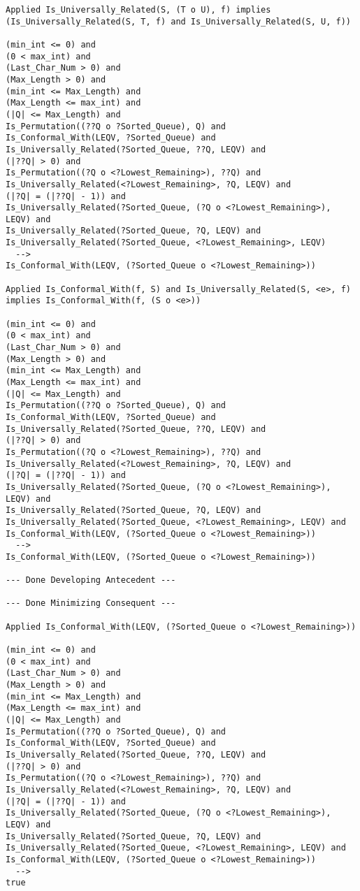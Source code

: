 \begin{lstlisting}[language=resolve]
Applied Is_Universally_Related(S, (T o U), f) implies (Is_Universally_Related(S, T, f) and Is_Universally_Related(S, U, f))

(min_int <= 0) and
(0 < max_int) and
(Last_Char_Num > 0) and
(Max_Length > 0) and
(min_int <= Max_Length) and
(Max_Length <= max_int) and
(|Q| <= Max_Length) and
Is_Permutation((??Q o ?Sorted_Queue), Q) and
Is_Conformal_With(LEQV, ?Sorted_Queue) and
Is_Universally_Related(?Sorted_Queue, ??Q, LEQV) and
(|??Q| > 0) and
Is_Permutation((?Q o <?Lowest_Remaining>), ??Q) and
Is_Universally_Related(<?Lowest_Remaining>, ?Q, LEQV) and
(|?Q| = (|??Q| - 1)) and
Is_Universally_Related(?Sorted_Queue, (?Q o <?Lowest_Remaining>), LEQV) and
Is_Universally_Related(?Sorted_Queue, ?Q, LEQV) and
Is_Universally_Related(?Sorted_Queue, <?Lowest_Remaining>, LEQV)
  -->
Is_Conformal_With(LEQV, (?Sorted_Queue o <?Lowest_Remaining>))

Applied Is_Conformal_With(f, S) and Is_Universally_Related(S, <e>, f) implies Is_Conformal_With(f, (S o <e>))

(min_int <= 0) and
(0 < max_int) and
(Last_Char_Num > 0) and
(Max_Length > 0) and
(min_int <= Max_Length) and
(Max_Length <= max_int) and
(|Q| <= Max_Length) and
Is_Permutation((??Q o ?Sorted_Queue), Q) and
Is_Conformal_With(LEQV, ?Sorted_Queue) and
Is_Universally_Related(?Sorted_Queue, ??Q, LEQV) and
(|??Q| > 0) and
Is_Permutation((?Q o <?Lowest_Remaining>), ??Q) and
Is_Universally_Related(<?Lowest_Remaining>, ?Q, LEQV) and
(|?Q| = (|??Q| - 1)) and
Is_Universally_Related(?Sorted_Queue, (?Q o <?Lowest_Remaining>), LEQV) and
Is_Universally_Related(?Sorted_Queue, ?Q, LEQV) and
Is_Universally_Related(?Sorted_Queue, <?Lowest_Remaining>, LEQV) and
Is_Conformal_With(LEQV, (?Sorted_Queue o <?Lowest_Remaining>))
  -->
Is_Conformal_With(LEQV, (?Sorted_Queue o <?Lowest_Remaining>))

--- Done Developing Antecedent ---

--- Done Minimizing Consequent ---

Applied Is_Conformal_With(LEQV, (?Sorted_Queue o <?Lowest_Remaining>))

(min_int <= 0) and
(0 < max_int) and
(Last_Char_Num > 0) and
(Max_Length > 0) and
(min_int <= Max_Length) and
(Max_Length <= max_int) and
(|Q| <= Max_Length) and
Is_Permutation((??Q o ?Sorted_Queue), Q) and
Is_Conformal_With(LEQV, ?Sorted_Queue) and
Is_Universally_Related(?Sorted_Queue, ??Q, LEQV) and
(|??Q| > 0) and
Is_Permutation((?Q o <?Lowest_Remaining>), ??Q) and
Is_Universally_Related(<?Lowest_Remaining>, ?Q, LEQV) and
(|?Q| = (|??Q| - 1)) and
Is_Universally_Related(?Sorted_Queue, (?Q o <?Lowest_Remaining>), LEQV) and
Is_Universally_Related(?Sorted_Queue, ?Q, LEQV) and
Is_Universally_Related(?Sorted_Queue, <?Lowest_Remaining>, LEQV) and
Is_Conformal_With(LEQV, (?Sorted_Queue o <?Lowest_Remaining>))
  -->
true


\end{lstlisting}

